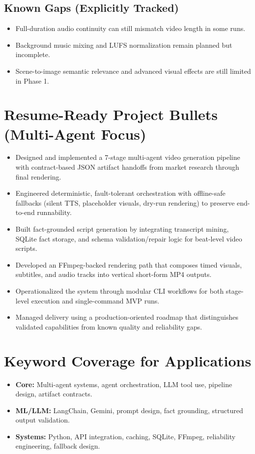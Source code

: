 \documentclass{article}
\begin{document}
\subsection*{Known Gaps (Explicitly Tracked)}
\begin{itemize}
    \item Full-duration audio continuity can still mismatch video length in some runs.
    \item Background music mixing and LUFS normalization remain planned but incomplete.
    \item Scene-to-image semantic relevance and advanced visual effects are still limited in Phase 1.
\end{itemize}

\section{Resume-Ready Project Bullets (Multi-Agent Focus)}
\begin{itemize}
    \item Designed and implemented a 7-stage multi-agent video generation pipeline with contract-based JSON artifact handoffs from market research through final rendering.
    \item Engineered deterministic, fault-tolerant orchestration with offline-safe fallbacks (silent TTS, placeholder visuals, dry-run rendering) to preserve end-to-end runnability.
    \item Built fact-grounded script generation by integrating transcript mining, SQLite fact storage, and schema validation/repair logic for beat-level video scripts.
    \item Developed an FFmpeg-backed rendering path that composes timed visuals, subtitles, and audio tracks into vertical short-form MP4 outputs.
    \item Operationalized the system through modular CLI workflows for both stage-level execution and single-command MVP runs.
    \item Managed delivery using a production-oriented roadmap that distinguishes validated capabilities from known quality and reliability gaps.
\end{itemize}

\section{Keyword Coverage for Applications}
\begin{itemize}
    \item \textbf{Core:} Multi-agent systems, agent orchestration, LLM tool use, pipeline design, artifact contracts.
    \item \textbf{ML/LLM:} LangChain, Gemini, prompt design, fact grounding, structured output validation.
    \item \textbf{Systems:} Python, API integration, caching, SQLite, FFmpeg, reliability engineering, fallback design.
\end{itemize}
\end{document}
